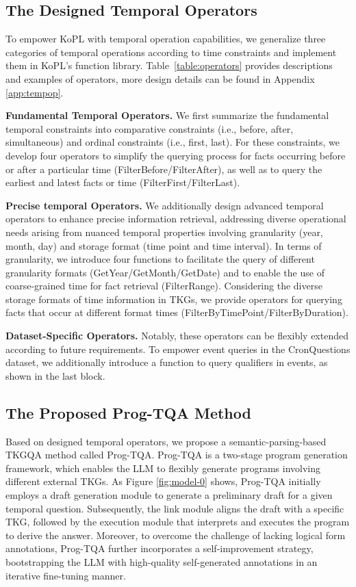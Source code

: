 \documentclass[10pt, a4paper]{article}
\begin{document}
\subsection{The Designed Temporal Operators}\label{sec:atq}
To empower KoPL with temporal operation capabilities, we generalize three categories of temporal operations according to time constraints and implement them in KoPL's function library. Table~\ref{table:operators} provides descriptions and examples of operators, more design details can be found in Appendix \ref{app:tempop}.

\textbf{Fundamental Temporal Operators.} 
We first summarize the fundamental temporal constraints into comparative constraints (i.e., before, after, simultaneous) and ordinal constraints (i.e., first, last).  For these constraints, we develop four operators to simplify the querying process for facts occurring before or after a particular time (FilterBefore/FilterAfter), as well as to query the earliest and latest facts or time (FilterFirst/FilterLast).


\textbf{Precise temporal Operators.} 
We additionally design advanced temporal operators to enhance precise information retrieval, addressing diverse operational needs arising from nuanced temporal properties involving granularity (year, month, day) and storage format (time point and time interval).
In terms of granularity, we introduce four functions to facilitate the query of different granularity formats (GetYear/GetMonth/GetDate) and to enable the use of coarse-grained time for fact retrieval (FilterRange).
Considering the diverse storage formats of time information in TKGs, we provide operators for querying facts that occur at different format times (FilterByTimePoint/FilterByDuration).

\textbf{Dataset-Specific Operators.} 
Notably, these operators can be flexibly extended according to future requirements. To empower event queries in the CronQuestions dataset, we additionally introduce a function to query qualifiers in events, as shown in the last block.
 
\subsection{The Proposed Prog-TQA Method}\label{sec:Prog-TQA}
Based on designed temporal operators, we propose a semantic-parsing-based TKGQA method called Prog-TQA. Prog-TQA is a two-stage program generation framework, which enables the LLM to flexibly generate programs involving different external TKGs. As Figure \ref{fig:model-0} shows, Prog-TQA initially employs a draft generation module to generate a preliminary draft for a given temporal question. Subsequently, the link module aligns the draft with a specific TKG, followed by the execution module that interprets and executes the program to derive the answer. Moreover, to overcome the challenge of lacking logical form annotations, Prog-TQA further incorporates a self-improvement strategy, bootstrapping the LLM with high-quality self-generated annotations in an iterative fine-tuning manner.
\end{document}
